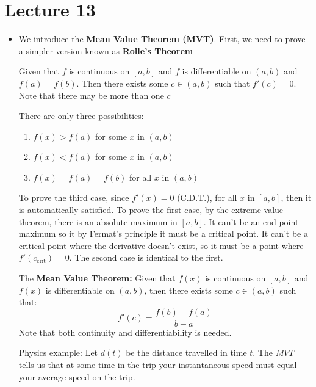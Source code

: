 \section{Lecture 13}
\begin{itemize}
    \item We introduce the \textbf{Mean Value Theorem (MVT)}. First, we need to prove a simpler version known as \textbf{Rolle's Theorem}
    \begin{theorem}
        Given that $f$ is continuous on $[a,b]$ and $f$ is differentiable on $(a,b)$ and $f(a)=f(b)$. Then there exists some $c \in (a,b)$ such that $f'(c)=0$. Note that there may be more than one $c$
    \end{theorem}
    \begin{prooof}
        There are only three possibilities:
        \begin{enumerate}
            \item $f(x)>f(a)$ for some $x$ in $(a,b)$
            \item $f(x)<f(a)$ for some $x$ in $(a,b)$
            \item $f(x)=f(a)=f(b)$ for all $x$ in $(a,b)$
        \end{enumerate}
        To prove the third case, since $f'(x)=0$ (C.D.T.), for all $x$ in $[a,b]$, then it is automatically satisfied. To prove the first case, by the extreme value theorem, there is an absolute maximum in $[a,b]$. It can't be an end-point maximum so it by Fermat's principle it must be a critical point. It can't be a critical point where the derivative doesn't exist, so it must be a point where $f'(c_\text{crit})=0$. The second case is identical to the first.
    \end{prooof}
    \begin{theorem}
        The \textbf{Mean Value Theorem:} Given that $f(x)$ is continuous on $[a,b]$ and $f(x)$ is differentiable on $(a,b)$, then there exists some $c\in (a,b)$ such that:
        \begin{equation}
            f'(c)=\frac{f(b)-f(a)}{b-a}
            \label{eq:}
        \end{equation}
        Note that both continuity and differentiability is needed.
    \end{theorem}
    \begin{example}
        Physics example: Let $d(t)$ be the distance travelled in time $t$. The $MVT$ tells us that at some time in the trip your instantaneous speed must equal your average speed on the trip.
    \end{example}

\end{itemize}
